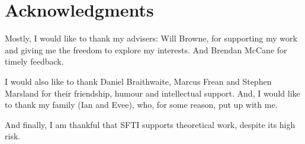 \chapter*{Acknowledgments}\label{C:ack}

Mostly, I would like to thank my advisers: Will Browne, for supporting my work and giving me the freedom to explore my interests.
And Brendan McCane for timely feedback.

I would also like to thank Daniel Braithwaite, Marcus Frean and Stephen Marsland
for their friendship, humour and intellectual support.
And, I would like to thank my family (Ian and Evee), who, for some reason, put up with me.

And finally, I am thankful that SFTI supports theoretical work, despite its high risk.

